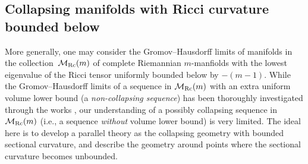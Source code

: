 \documentclass[10pt,a4paper]{amsart}
\numberwithin{equation}{section}
\begin{document}
\subsection{Collapsing manifolds with Ricci curvature bounded below}\label{section2.3}
More generally, one may consider the Gromov--Hausdorff limits of manifolds in
the collec\-tion~$\mathcal{M}_{\rm Rc}(m)$ of complete Riemannian $m$-manfiolds with
the lowest eigenvalue of the Ricci tensor uniformly bounded below by $-(m-1)$.
While the Gromov--Hausdorff limits of a sequence in $\mathcal{M}_{\rm Rc}(m)$ with an
extra uniform volume lower bound (a \emph{non-collapsing sequence}) has been
thoroughly investigated through the works \cite{ChCoI, CJN18}, our understanding
of a possibly collapsing sequence in $\mathcal{M}_{\rm Rc}(m)$ (i.e., a sequence
\emph{without} volume lower bound) is very limited. The ideal here is to
develop a parallel theory as the collapsing geometry with bounded
sectional curvature, and describe the geometry around points where the
sectional curvature becomes unbounded.
\end{document}
